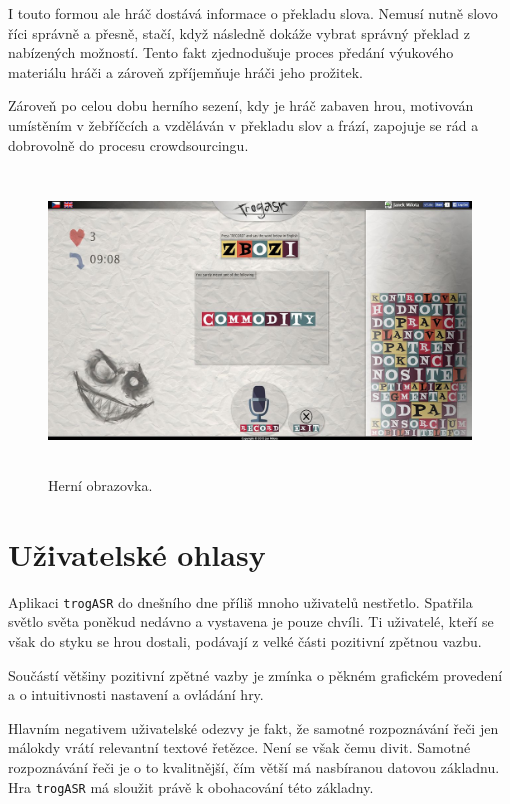 I touto formou ale hráč dostává informace o překladu slova. Nemusí nutně slovo říci správně a přesně, stačí, když následně dokáže vybrat správný překlad z nabízených možností. Tento fakt zjednodušuje proces předání výukového materiálu hráči a zároveň zpříjemňuje hráči jeho prožitek.

Zároveň po celou dobu herního sezení, kdy je hráč zabaven hrou, motivován umístěním v žebříčcích a vzděláván v překladu slov a frází, zapojuje se rád a dobrovolně do procesu crowdsourcingu.

\begin{figure}[h]
	\centering
	\includegraphics[width=140mm,height=80mm]{img/game.jpg}
	\caption{Herní obrazovka.}
	\label{fig:game}
\end{figure}

\section{Uživatelské ohlasy}

Aplikaci \verb|trogASR| do dnešního dne příliš mnoho uživatelů nestřetlo. Spatřila světlo světa poněkud nedávno a vystavena je pouze chvíli. Ti uživatelé, kteří se však do styku se hrou dostali, podávají z velké části pozitivní zpětnou vazbu.

Součástí většiny pozitivní zpětné vazby je zmínka o pěkném grafickém provedení a o intuitivnosti nastavení a ovládání hry.

Hlavním negativem uživatelské odezvy je fakt, že samotné rozpoznávání řeči jen málokdy vrátí relevantní textové řetězce. Není se však čemu divit. Samotné rozpoznávání řeči je o to kvalitnější, čím větší má nasbíranou datovou základnu. Hra \verb|trogASR| má sloužit právě k obohacování této základny.